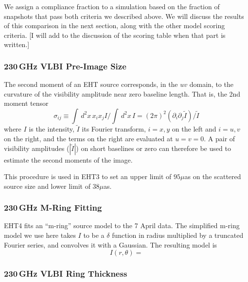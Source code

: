 We assign a compliance fraction to a simulation based on the fraction
of snapshots that pass both criteria we described above.
We will discuss the results of this comparison in the next section,
along with the other model scoring criteria.
[I will add to the discussion of the scoring table when that part is
  written.]

\subsubsection{230\,GHz VLBI Pre-Image Size}


The second moment of an EHT source corresponds, in the $uv$ domain, to
the curvature of the visibility amplitude near zero baseline length.
That is, the 2nd moment tensor
\begin{equation}
    \sigma_{ij} \equiv \int \, d^2x\, x_i x_j I/\int \, d^2x \, I = (2\pi)^2 \left(\partial_i \partial_j \tilde{I}\right)/\tilde{I}
\end{equation}
where $I$ is the intensity, $\tilde{I}$ its Fourier transform, $i =
x,y$ on the left and $i = u,v$ on the right, and the terms on the
right are evaluated at $u = v = 0$.
A pair of visibility amplitudes ($|\tilde{I}|$) on short baselines or
zero can therefore be used to estimate the second moments of the
image.

This procedure is used in EHT3 to set an upper limit of $95\mu$as on
the scattered source size and lower limit of $38\mu$as.

\subsubsection{230\,GHz M-Ring Fitting}

EHT4 fits an ``m-ring'' source model to the 7 April data.
The simplified m-ring model we use here takes $I$ to be a $\delta$
function in radius multiplied by a truncated Fourier series, and
convolves it with a Gaussian.
The resulting model is
\begin{equation}
    I(r,\theta) =
\end{equation}

\subsubsection{230\,GHz VLBI Ring Thickness}

